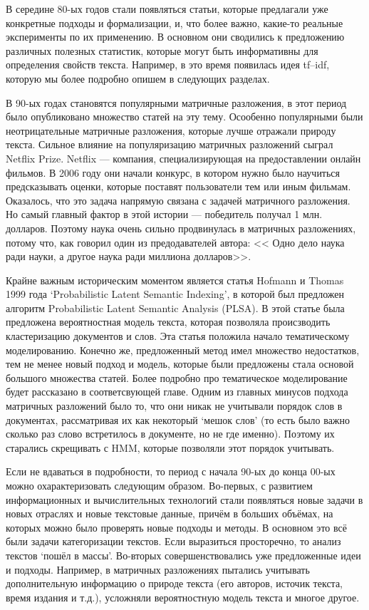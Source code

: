 \documentclass[a4paper,14pt]{extarticle}
\begin{document}
В середине 80-ых годов стали появляться статьи, которые предлагали уже конкретные подходы и формализации, и, что более важно, какие-то реальные эксперименты по их применению. В основном они сводились к предложению различных полезных статистик, которые могут быть информативны для определения свойств текста. Например, в это время появилась идея tf–idf, которую мы более подробно опишем в следующих разделах.

В  90-ых годах становятся популярными матричные разложения, в этот период было опубликовано множество статей на эту тему. Осообенно популярными были неотрицательные матричные разложения, которые лучше отражали природу текста. Сильное влияние на популяризацию матричных разложений сыграл Netflix Prize. Netflix --- компания, специализирующая на предоставлении онлайн фильмов. В 2006 году они начали конкурс, в котором нужно было научиться предсказывать оценки, которые поставят пользователи тем или иным фильмам. Оказалось, что это задача напрямую связана с задачей матричного разложения. Но самый главный фактор в этой истории --- победитель получал 1 млн. долларов. Поэтому наука очень сильно продвинулась в матричных разложениях, потому что, как говорил один из предодавателей автора: << Одно дело наука ради науки, а другое наука ради миллиона долларов>>.

Крайне важным историческим моментом является статья  Hofmann и Thomas 1999 года `Probabilistic Latent Semantic Indexing', в которой был предложен алгоритм Probabilistic Latent Semantic Analysis (PLSA). В этой статье была предложена вероятностная модель текста, которая позволяла происзводить кластеризацию документов и слов. Эта статья положила начало тематическому моделированию. Конечно же, предложенный метод имел множество недостатков, тем не менее новый подход и модель, которые были предложены стала основой большого множества статей. Более подробно про тематическое моделирование будет рассказано в соответсвующей главе. Одним из главных минусов  подхода матричных разложений было то, что они никак не учитывали порядок слов в документах, рассматривая их как некоторый `мешок слов' (то есть было важно сколько раз слово встретилось в документе, но не где именно). Поэтому их старались скрещивать с HMM, которые позволяли этот порядок учитывать.

Если не вдаваться в подробности, то период с начала 90-ых до конца 00-ых можно охарактеризовать следующим образом. Во-первых, с развитием информационных и вычислительных технологий стали появляться новые задачи в новых отраслях и новые текстовые данные, причём в больших объёмах, на которых можно было проверять новые подходы и методы. В основном это всё были задачи категоризации текстов. Если выразиться просторечно, то анализ текстов `пошёл в массы'. Во-вторых совершенствовались уже предложенные идеи и подходы. Например, в матричных разложениях пытались учитывать дополнительную информацию о природе текста (его авторов, источик текста, время издания и т.д.), усложняли вероятностную модель текста и многое другое.
\end{document}
